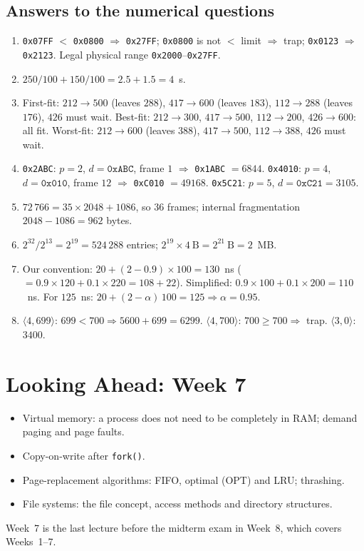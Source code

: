 \documentclass[11pt,a4paper]{article}
\newcommand{\cmd}[1]{\texttt{#1}}
\begin{document}
\subsection*{Answers to the numerical questions}
\begin{enumerate}[leftmargin=1.6em,start=14]
  \item \texttt{0x07FF} $<$ \texttt{0x0800} $\Rightarrow$ \texttt{0x27FF}; \texttt{0x0800} is not $<$ limit $\Rightarrow$ trap; \texttt{0x0123} $\Rightarrow$ \texttt{0x2123}. Legal physical range \texttt{0x2000}--\texttt{0x27FF}.
  \item $250/100 + 150/100 = 2.5 + 1.5 = 4$~s.
  \item First-fit: $212\to500$ (leaves $288$), $417\to600$ (leaves $183$), $112\to288$ (leaves $176$), $426$ must wait. Best-fit: $212\to300$, $417\to500$, $112\to200$, $426\to600$: all fit. Worst-fit: $212\to600$ (leaves $388$), $417\to500$, $112\to388$, $426$ must wait.
  \item \texttt{0x2ABC}: $p=2$, $d=\texttt{0xABC}$, frame $1$ $\Rightarrow$ \texttt{0x1ABC} $= 6844$. \texttt{0x4010}: $p=4$, $d=\texttt{0x010}$, frame $12$ $\Rightarrow$ \texttt{0xC010} $= 49168$. \texttt{0x5C21}: $p=5$, $d=\texttt{0xC21} = 3105$.
  \item $72\,766 = 35 \times 2048 + 1086$, so $36$ frames; internal fragmentation $2048 - 1086 = 962$ bytes.
  \item $2^{32}/2^{13} = 2^{19} = 524\,288$ entries; $2^{19}\times 4\ \text{B} = 2^{21}\ \text{B} = 2$~MB.
  \item Our convention: $20 + (2-0.9)\times100 = 130$~ns ($= 0.9\times120 + 0.1\times220 = 108 + 22$). Simplified: $0.9\times100 + 0.1\times200 = 110$~ns. For $125$~ns: $20 + (2-\alpha)\,100 = 125 \Rightarrow \alpha = 0.95$.
  \item $\langle 4, 699\rangle$: $699 < 700 \Rightarrow 5600 + 699 = 6299$. $\langle 4, 700\rangle$: $700 \ge 700 \Rightarrow$ trap. $\langle 3, 0\rangle$: $3400$.
\end{enumerate}

\section{Looking Ahead: Week 7}

\begin{itemize}
  \item Virtual memory: a process does not need to be completely in RAM; demand paging and page faults.
  \item Copy-on-write after \cmd{fork()}.
  \item Page-replacement algorithms: FIFO, optimal (OPT) and LRU; thrashing.
  \item File systems: the file concept, access methods and directory structures.
\end{itemize}
Week~7 is the last lecture before the midterm exam in Week~8, which covers Weeks~1--7.
\end{document}

